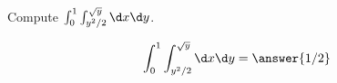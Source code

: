 \documentclass{ximera}
\author{David Guichard \and Neal Koblitz \and H. Jerome Keisler \and Albert Scheller \and Barry Balof \and Mike Wills \and Matthew Carr}
\begin{document}
\begin{exercise}




Compute $\int_{0}^{1}\int_{y^2/2}^{\sqrt{y}}\d x\d y$.
\begin{prompt}
\[
\int_{0}^{1}\int_{y^2/2}^{\sqrt{y}} \d x\d y=\answer{1/2}
\]
\end{prompt}



\end{exercise}
\end{document}
